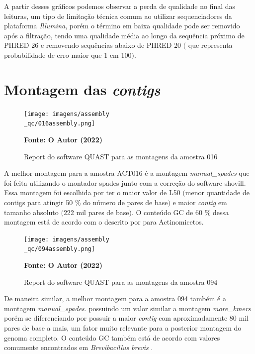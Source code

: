 A partir desses gráficos podemos observar a perda de qualidade no final das leituras, um tipo de limitação
técnica comum ao utilizar sequenciadores da plataforma \textit{Illumina}, porém o término em baixa qualidade
pode ser removido após a filtração, tendo uma qualidade média ao longo da sequência próximo de PHRED 26 e
removendo sequências abaixo de PHRED 20 $($ que representa probabilidade de erro maior que 1 em 100$)$.


\section{Montagem das \textit{contigs}}

\begin{figure}[H]
	\caption{Report do software QUAST para as montagens da amostra 016}
	\label{fig:quast_16}
	\centering
		\texttt{[image: imagens/assembly\\\_qc/016assembly.png]} \\
	\centering
    \begin{small}\textbf{Fonte: O Autor (2022)}\end{small}
\end{figure}
\vspace{\floatsep}

A melhor montagem para a amostra ACT016 é a montagem \textit{manual\_spades} que foi feita utilizando
o montador spades junto com a correção do software shovill. Essa montagem foi escolhida por ter o maior
valor de L50 $($menor quantidade de contigs para atingir 50 \% do número de pares de base$)$ e maior 
\textit{contig} em tamanho absoluto $($222 mil pares de base$)$. O conteúdo GC de 60 \% dessa montagem está de acordo
com o descrito por  para Actinomicetos.


\begin{figure}[H]
	\caption{Report do software QUAST para as montagens da amostra 094}
	\label{fig:quast_16}
	\centering
		\texttt{[image: imagens/assembly\\\_qc/094assembly.png]} \\
	\centering
    \begin{small}\textbf{Fonte: O Autor (2022)}\end{small}
\end{figure}
\vspace{\floatsep}

De maneira similar, a melhor montagem para a amostra 094 também é a montagem \textit{manual\_spades}.
possuindo um valor similar a montagem \textit{more\_kmers} porém se diferenciando por possuir a maior \textit{contig}
com aproximadamente 80 mil pares de base a mais, um fator muito relevante para a posterior montagem do genoma completo.
O conteúdo GC também está de acordo com valores comumente encontrados em \textit{Brevibacillus brevis} \cite{nakamura1991bacillus}.

